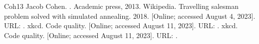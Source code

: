 \documentclass[letterpaper,10pt,english]{jupyterBook}
\begin{document}
\begin{sphinxthebibliography}{Coh13}
\sphinxAtStartPar
Jacob Cohen. . Academic press, 2013.
\sphinxAtStartPar
Wikipedia. Travelling salesman problem solved with simulated annealing. 2018. {[}Online; accessed August 4, 2023{]}. URL: .
\sphinxAtStartPar
xkcd. Code quality. {[}Online; accessed August 11, 2023{]}. URL: .
\sphinxAtStartPar
xkcd. Code quality. {[}Online; accessed August 11, 2023{]}. URL: .
\end{sphinxthebibliography}







\renewcommand{\indexname}{Index}
\printindex
\end{document}
